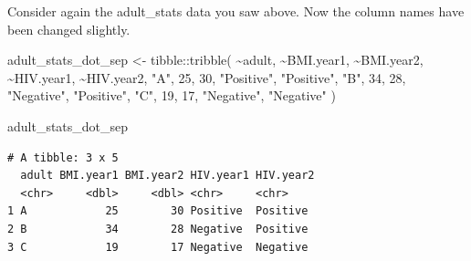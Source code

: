 \documentclass[
  letterpaper,
  DIV=11,
  numbers=noendperiod]{scrreprt}
\newenvironment{Shaded}{\begin{snugshade}}{\end{snugshade}}
\newcommand{\AttributeTok}[1]{\textcolor[rgb]{0.40,0.45,0.13}{#1}}
\newcommand{\DecValTok}[1]{\textcolor[rgb]{0.68,0.00,0.00}{#1}}
\newcommand{\FunctionTok}[1]{\textcolor[rgb]{0.28,0.35,0.67}{#1}}
\newcommand{\NormalTok}[1]{\textcolor[rgb]{0.00,0.23,0.31}{#1}}
\newcommand{\OtherTok}[1]{\textcolor[rgb]{0.00,0.23,0.31}{#1}}
\newcommand{\SpecialCharTok}[1]{\textcolor[rgb]{0.37,0.37,0.37}{#1}}
\newcommand{\StringTok}[1]{\textcolor[rgb]{0.13,0.47,0.30}{#1}}
\begin{document}
\begin{tcolorbox}[enhanced jigsaw, titlerule=0mm, colback=white, left=2mm, breakable, opacitybacktitle=0.6, colbacktitle=quarto-callout-tip-color!10!white, colframe=quarto-callout-tip-color-frame, bottomtitle=1mm, opacityback=0, coltitle=black, arc=.35mm, toptitle=1mm, title=\textcolor{quarto-callout-tip-color}{\faLightbulb}\hspace{0.5em}{Practice}, leftrule=.75mm, toprule=.15mm, bottomrule=.15mm, rightrule=.15mm]

Consider again the adult\_stats data you saw above. Now the column names
have been changed slightly.

\begin{Shaded}
\begin{Highlighting}[]
\NormalTok{adult\_stats\_dot\_sep }\OtherTok{\textless{}{-}} 
\NormalTok{  tibble}\SpecialCharTok{::}\FunctionTok{tribble}\NormalTok{(}
    \SpecialCharTok{\textasciitilde{}}\NormalTok{adult,  }\SpecialCharTok{\textasciitilde{}}\StringTok{\textasciigrave{}}\AttributeTok{BMI.year1}\StringTok{\textasciigrave{}}\NormalTok{,  }\SpecialCharTok{\textasciitilde{}}\StringTok{\textasciigrave{}}\AttributeTok{BMI.year2}\StringTok{\textasciigrave{}}\NormalTok{,  }\SpecialCharTok{\textasciitilde{}}\StringTok{\textasciigrave{}}\AttributeTok{HIV.year1}\StringTok{\textasciigrave{}}\NormalTok{,  }\SpecialCharTok{\textasciitilde{}}\StringTok{\textasciigrave{}}\AttributeTok{HIV.year2}\StringTok{\textasciigrave{}}\NormalTok{,}
       \StringTok{"A"}\NormalTok{,            }\DecValTok{25}\NormalTok{,            }\DecValTok{30}\NormalTok{,    }\StringTok{"Positive"}\NormalTok{,   }\StringTok{"Positive"}\NormalTok{,}
       \StringTok{"B"}\NormalTok{,            }\DecValTok{34}\NormalTok{,            }\DecValTok{28}\NormalTok{,    }\StringTok{"Negative"}\NormalTok{,   }\StringTok{"Positive"}\NormalTok{,}
       \StringTok{"C"}\NormalTok{,            }\DecValTok{19}\NormalTok{,            }\DecValTok{17}\NormalTok{,    }\StringTok{"Negative"}\NormalTok{,   }\StringTok{"Negative"}
\NormalTok{  )}


\NormalTok{adult\_stats\_dot\_sep}
\end{Highlighting}
\end{Shaded}

\begin{verbatim}
# A tibble: 3 x 5
  adult BMI.year1 BMI.year2 HIV.year1 HIV.year2
  <chr>     <dbl>     <dbl> <chr>     <chr>    
1 A            25        30 Positive  Positive 
2 B            34        28 Negative  Positive 
3 C            19        17 Negative  Negative 
\end{verbatim}


\end{tcolorbox}
\end{document}
